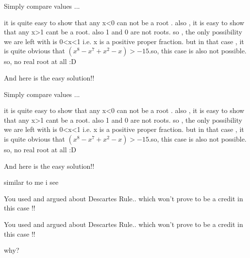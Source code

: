 \begin{solution}
	Simply compare values ...


 \begin{tcolorbox}it is quite easy to show that any x<0 can not be a root . also , it is easy to show that any x>1 cant be a root.
also 1 and 0 are not roots. so , the only possibility we are left with is 0<x<1 i.e. x is a positive proper fraction.
but in that case , it is quite obvious that $(x^8-x^7+x^2-x)>-15$.so, this case is also not possible. so, no real root at all :D\end{tcolorbox}

And here is the easy solution!!
\end{solution}



\begin{solution}
	\begin{tcolorbox}Simply compare values ...


 \begin{tcolorbox}it is quite easy to show that any x<0 can not be a root . also , it is easy to show that any x>1 cant be a root.
also 1 and 0 are not roots. so , the only possibility we are left with is 0<x<1 i.e. x is a positive proper fraction.
but in that case , it is quite obvious that $(x^8-x^7+x^2-x)>-15$.so, this case is also not possible. so, no real root at all :D\end{tcolorbox}

And here is the easy solution!!\end{tcolorbox}

similar to me i see
\end{solution}



\begin{solution}
	You used and argued about Descartes Rule.. which won't prove to be a credit in this case !!
\end{solution}



\begin{solution}
	\begin{tcolorbox}You used and argued about Descartes Rule.. which won't prove to be a credit in this case !!\end{tcolorbox}

why?
\end{solution}



